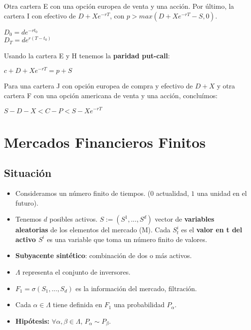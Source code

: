\documentclass[
10pt, %
a4paper, %
oneside, %
headinclude,footinclude, %
BCOR5mm, %
]{scrartcl}
\newcommand{\n}[1]{\textbf{#1}}
\newcommand{\sub}[1]{_{#1}}
\newcommand{\pot}[1]{^{#1}}
\newcommand{\f}[1]{{\large{${#1}$}}}
\newcounter{ex}
\begin{document}
					Otra cartera E con una opción europea de venta y una acción. Por último, la cartera I con efectivo de \f{D+Xe\pot{-rT}}, con \f{p > max(D+Xe\pot{-rT}-S, 0)}.
					\begin{center} \f{D\sub{0} = de\pot{-rt\sub{0}}} \\ \f{D\sub{T} = d e\pot{r(T-t\sub{0})}} \end{center}

					Usando la cartera E y H tenemos la \n{paridad put-call}: 
					\begin{center} \f{c + D + Xe\pot{-rT} = p + S} \end{center}

					Para una cartera J con opción europea de compra y efectivo de \f{D + X} y otra cartera F con una opción americana de venta y una acción, concluímos:
					\begin{center} \f{S - D - X < C - P < S - Xe\pot{-rT}} \end{center}

	\newpage

\section{Mercados Financieros Finitos}

	\subsection{Situación}

		\begin{itemize}
			\item Consideramos un número finito de tiempos. (\f{0} actualidad, \f{1} una unidad en el futuro).
			\item Tenemos \f{d} posibles activos. \f{S := (S\pot{1},...,S\pot{d})} vector de \n{variables aleatorias} de los elementos del mercado (M). Cada \f{S\sub{t}\pot{i}} es el \n{valor en t del activo \f{S\pot{i}}} es una variable que toma un número finito de valores.
			\item \n{Subyacente sintético}: combinación de dos o más activos.
			\item \f{\Lambda} representa el conjunto de inversores.
			\item \f{F\sub{1} = \sigma(S\sub{1},...,S\sub{d})} es la información del mercado, filtración.
			\item Cada \f{\alpha \in \Lambda} tiene definida en \f{F\sub{1}} una probabilidad \f{P\sub{\alpha}}.
			\item \n{Hipótesis:} \f{\forall \alpha,\beta \in \Lambda}, \f{P\sub{\alpha} \sim P\sub{\beta}}.
		\end{itemize}
\end{document}
